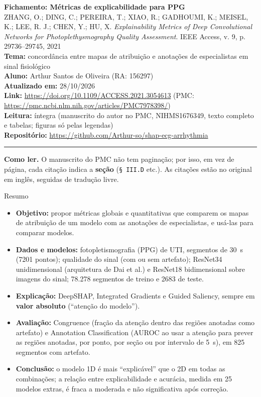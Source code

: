 \documentclass[11pt,a4paper]{article}
\begin{document}
\begin{center}
    {\LARGE \textbf{Fichamento: Métricas de explicabilidade para PPG}} \\[0.35em]
    {\large ZHANG, O.; DING, C.; PEREIRA, T.; XIAO, R.; GADHOUMI, K.; MEISEL, K.; LEE, R. J.; CHEN, Y.; HU, X. \textit{Explainability Metrics of Deep Convolutional Networks for Photoplethysmography Quality Assessment}. IEEE Access, v. 9, p. 29736--29745, 2021} \\[0.3em]
    \textbf{Tema:} concordância entre mapas de atribuição e anotações de especialistas em sinal fisiológico \\[0.2em]
    \textbf{Aluno:} Arthur Santos de Oliveira (RA: 156297) \\[0.2em]
    \textbf{Atualizado em:} 28/10/2026 \\[0.2em]
    \textbf{Link:} \url{https://doi.org/10.1109/ACCESS.2021.3054613} (PMC: \url{https://pmc.ncbi.nlm.nih.gov/articles/PMC7978398/}) \\[0.2em]
    \textbf{Leitura:} íntegra (manuscrito do autor no PMC, NIHMS1676349, texto completo e tabelas; figuras só pelas legendas) \\[0.2em]
    \textbf{Repositório:} \url{https://github.com/Arthur-so/shap-ecg-arrhythmia}
\end{center}
\vspace{-0.5em}
\hrule
\vspace{0.8em}

\textbf{Como ler.} O manuscrito do PMC não tem paginação; por isso, em vez de página, cada citação indica a \textbf{seção} (\texttt{§ III.D} etc.). As citações estão no original em inglês, seguidas de tradução livre.

\begin{infobox}[note]{Resumo}
\begin{itemize}
\item \textbf{Objetivo:} propor métricas globais e quantitativas que comparem os mapas de atribuição de um modelo com as anotações de especialistas, e usá-las para comparar modelos.
\item \textbf{Dados e modelos:} fotopletismografia (PPG) de UTI, segmentos de 30~s (7201 pontos); qualidade do sinal (com ou sem artefato); ResNet34 unidimensional (arquitetura de Dai et al.) e ResNet18 bidimensional sobre imagens do sinal; 78.278 segmentos de treino e 2683 de teste.
\item \textbf{Explicação:} DeepSHAP, Integrated Gradients e Guided Saliency, sempre em \textbf{valor absoluto} (“atenção do modelo”).
\item \textbf{Avaliação:} Congruence (fração da atenção dentro das regiões anotadas como artefato) e Annotation Classification (AUROC ao usar a atenção para prever as regiões anotadas, por ponto, por seção ou por intervalo de 5~s), em 825 segmentos com artefato.
\item \textbf{Conclusão:} o modelo 1D é mais “explicável” que o 2D em todas as combinações; a relação entre explicabilidade e acurácia, medida em 25 modelos extras, é fraca a moderada e não significativa após correção.
\end{itemize}
\end{infobox}
\end{document}
